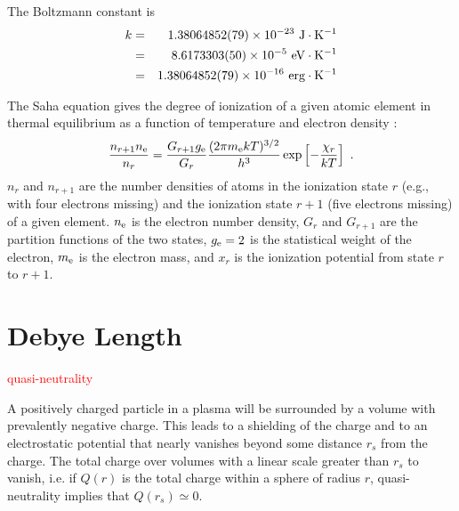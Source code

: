 \documentclass[12pt,a4paper]{article}
\begin{document}
The Boltzmann constant is
\begin{eqnarray*}
k &=& 1.38064852(79) \times 10^{-23} ~{\rm J\cdot K^{-1}} \\ 
&=& 8.6173303(50) \times 10^{-5} ~{\rm eV\cdot K^{-1}} \\ 
&=& 1.38064852(79) \times 10^{-16} ~{\rm erg\cdot K^{-1}}
\end{eqnarray*}

The Saha equation gives the degree of ionization of a given atomic element in thermal equilibrium as a function of temperature and electron density :
\begin{equation}
\frac{n_{r+1} n_{\rm e} }{n_r} = \frac{G_{r+1} g_{\rm e} }{G_r} \frac{(2\pi m_{\rm e} k T)^{3/2}}{h^3} \exp \left[-\frac{\chi_r}{kT} \right] ~.
\end{equation}
$n_r$ and $n_{r+1}$ are the number densities of atoms in the ionization state $r$ (e.g., with four electrons missing) and the ionization state $r+1$ (five electrons missing) of a given element. $n_{\rm e}$ is the electron number density, $G_r$ and $G_{r+1}$ are the partition functions of the two states, $g_{\rm e} = 2$ is the statistical weight of the electron, $m_{\rm e}$ is the electron mass, and $x_r$ is the ionization potential from state $r$ to $r+1$. 


\section{Debye Length}
\textcolor{red}{quasi-neutrality}

\cite{2015bps..book.....C} A positively charged particle in a plasma will be surrounded by a volume with prevalently negative charge. This leads to a shielding of the charge and to an electrostatic potential that nearly vanishes beyond some distance $r_s$ from the charge. The total charge over volumes with a linear scale greater than $r_s$ to vanish, i.e. if $Q(r)$ is the total charge within a sphere of radius $r$, quasi-neutrality implies that $Q(r_s) \simeq 0$.
\end{document}
